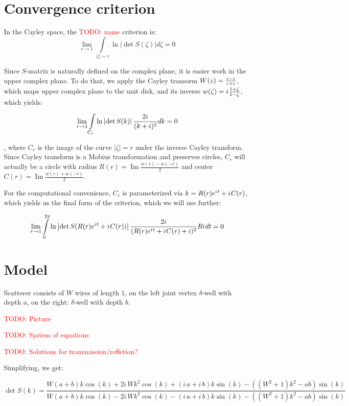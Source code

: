 \documentclass[12pt, a4paper]{article}
\newcommand{\abs}[1]{\left| #1 \right|}
\newcommand{\eexp}[1]{e^{#1}}
\newcommand{\iu}{{i\mkern1mu}}
\renewcommand{\Im}{\operatorname{Im}}
\newcommand{\todo}[1]{{\large \textcolor{red}{TODO: #1}}}
\begin{document}
\section{Convergence criterion}

In the Cayley space, the \todo{name} criterion is:
\[
\lim\limits_{r \to 1} \int\limits_{\abs{\zeta} = r} \ln \abs{\det S(\zeta)} d\zeta = 0
\]

Since $S$-matrix is naturally defined on the complex plane, it is easier work in the upper complex plane. To do that, we apply the Cayley transorm $W(z) = \frac{z - \iu}{z + \iu}$, which maps upper complex plane to the unit disk, and its inverse $w(\zeta) = \iu \frac{1 + \zeta}{1 - \zeta}$, which yields:

\begin{equation}\label{crit}
\lim\limits_{r \to 1} \int\limits_{C_r} \ln \abs{\det S(k)} \frac{2 \iu}{(k + i)^2} dk = 0
\end{equation}

, where $C_r$ is the image of the curve $\abs{\zeta} = r$ under the inverse Cayley transform. Since Cayley transform is a Mobius transformation and preserves circles, $C_r$ will actually be a circle with radius $R(r) = \Im \frac{w(r) - w(-r)}{2}$ and center $C(r) = \Im \frac{w(r) + w(-r)}{2}$.

For the computational convenience, $C_r$ is parameterized via $k = R(r) \eexp{\iu t} + \iu C(r)$, which yields us the final form of the criterion, which we will use further:

\begin{equation}\label{critp}
\lim\limits_{r \to 1} \int\limits_{0}^{2 \pi} \ln \abs{\det S(R(r) \eexp{\iu t} + \iu C(r))} \frac{2 \iu}{(R(r) \eexp{\iu t} + \iu C(r) + i)^2} R \iu dt = 0
\end{equation}

\section{Model}

Scatterer consists of $W$ wires of length $1$, on the left joint vertex $\delta$-well with depth $a$, on the right: $\delta$-well with depth $b$. 

\todo{Picture}

\todo{System of equations}

\todo{Solutions for transmission/refletion?}

Simplifying, we get:

\[
\det S(k) = \frac{W {\left(a + b\right)} k \cos\left(k\right) + 2 i \, W k^{2} \cos\left(k\right) + {\left(i \, a + i \, b\right)} k \sin\left(k\right) - {\left({\left(W^{2} + 1\right)} k^{2} - a b\right)} \sin\left(k\right)}{W {\left(a + b\right)} k \cos\left(k\right) - 2 i \, W k^{2} \cos\left(k\right) - {\left(i \, a + i \, b\right)} k \sin\left(k\right) - {\left({\left(W^{2} + 1\right)} k^{2} - a b\right)} \sin\left(k\right)}
\]
\end{document}
